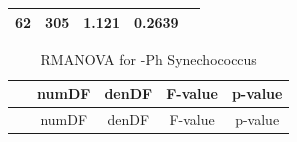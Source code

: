 \documentclass[]{article}
\begin{document}
\begin{longtable}[]{@{}ccccc@{}}
\begin{minipage}[t]{0.10\columnwidth}\centering\strut
62
\strut\end{minipage} &
\begin{minipage}[t]{0.10\columnwidth}\centering\strut
305
\strut\end{minipage} &
\begin{minipage}[t]{0.12\columnwidth}\centering\strut
1.121
\strut\end{minipage} &
\begin{minipage}[t]{0.12\columnwidth}\centering\strut
0.2639
\strut\end{minipage}\tabularnewline
\bottomrule
\end{longtable}

\begin{longtable}[]{@{}ccccc@{}}
\caption{RMANOVA for -Ph Synechococcus}\tabularnewline
\toprule
\begin{minipage}[b]{0.21\columnwidth}\centering\strut
~
\strut\end{minipage} &
\begin{minipage}[b]{0.10\columnwidth}\centering\strut
numDF
\strut\end{minipage} &
\begin{minipage}[b]{0.10\columnwidth}\centering\strut
denDF
\strut\end{minipage} &
\begin{minipage}[b]{0.12\columnwidth}\centering\strut
F-value
\strut\end{minipage} &
\begin{minipage}[b]{0.12\columnwidth}\centering\strut
p-value
\strut\end{minipage}\tabularnewline
\midrule
\endfirsthead
\toprule
\begin{minipage}[b]{0.21\columnwidth}\centering\strut
~
\strut\end{minipage} &
\begin{minipage}[b]{0.10\columnwidth}\centering\strut
numDF
\strut\end{minipage} &
\begin{minipage}[b]{0.10\columnwidth}\centering\strut
denDF
\strut\end{minipage} &
\begin{minipage}[b]{0.12\columnwidth}\centering\strut
F-value
\strut\end{minipage} &
\begin{minipage}[b]{0.12\columnwidth}\centering\strut
p-value
\strut\end{minipage}\tabularnewline
\midrule

\end{longtable}
\end{document}
